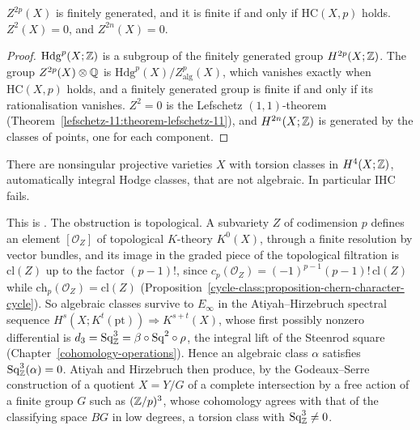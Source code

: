 \begin{proposition}\label{failures:proposition-defect-finite}
$Z^{2p}(X)$ is finitely generated, and it is finite if and only if $\mathrm{HC}(X, p)$ holds. $Z^2(X) = 0$, and $Z^{2n}(X) = 0$.
\end{proposition}

\begin{proof}
$\mathrm{Hdg}^p(X; \mathbb{Z})$ is a subgroup of the finitely generated group $H^{2p}(X; \mathbb{Z})$. The group $Z^{2p}(X) \otimes \mathbb{Q}$ is $\mathrm{Hdg}^p(X)/Z^p_{\mathrm{alg}}(X)$, which vanishes exactly when
$\mathrm{HC}(X, p)$ holds, and a finitely generated group is finite if and only if its rationalisation vanishes. $Z^2 = 0$ is the Lefschetz $(1,1)$-theorem (Theorem~\ref{lefschetz-11:theorem-lefschetz-11}),
and $H^{2n}(X; \mathbb{Z})$ is generated by the classes of points, one for each component.
\end{proof}

\begin{theorem}\label{failures:theorem-atiyah-hirzebruch}
There are nonsingular projective varieties $X$ with torsion classes in $H^4(X; \mathbb{Z})$, automatically integral Hodge classes, that are not algebraic. In particular $\mathrm{IHC}$ fails.
\end{theorem}

This is \cite{atiyah-hirzebruch-1962}. The obstruction is topological. A subvariety $Z$ of codimension $p$ defines an element $[\mathcal{O}_Z]$ of topological $K$-theory $K^0(X)$, through a finite
resolution by vector bundles, and its image in the graded piece of the topological filtration is $\mathrm{cl}(Z)$ up to the factor $(p-1)!$, since $c_p(\mathcal{O}_Z) = (-1)^{p-1}(p-1)!\,\mathrm{cl}(Z)$
while $\mathrm{ch}_p(\mathcal{O}_Z) = \mathrm{cl}(Z)$ (Proposition~\ref{cycle-class:proposition-chern-character-cycle}). So algebraic classes survive to $E_\infty$ in the Atiyah--Hirzebruch spectral sequence
$H^s(X; K^t(\mathrm{pt})) \Rightarrow K^{s+t}(X)$, whose first possibly nonzero differential is $d_3 = \mathrm{Sq}^3_{\mathbb{Z}} = \beta\circ\mathrm{Sq}^2\circ\rho$, the integral lift of the Steenrod square
(Chapter~\ref{cohomology-operations}). Hence an algebraic class $\alpha$ satisfies $\mathrm{Sq}^3_{\mathbb{Z}}(\alpha) = 0$. Atiyah and Hirzebruch then produce, by the Godeaux--Serre construction of a quotient
$X = Y/G$ of a complete intersection by a free action of a finite group $G$ such as $(\mathbb{Z}/p)^3$, whose cohomology agrees with that of the classifying space $BG$ in low degrees, a torsion class with
$\mathrm{Sq}^3_{\mathbb{Z}} \neq 0$.

